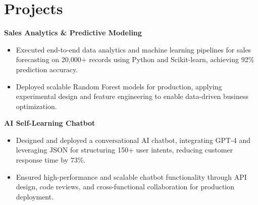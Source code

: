 \documentclass[a4paper,10pt]{article}
\begin{document}
\vspace{-4mm}

\section*{Projects}
\textbf{Sales Analytics \& Predictive Modeling} \\
\begin{itemize}[leftmargin=*, itemsep=0pt, parsep=1pt]
\vspace{-7mm}
    \item Executed end-to-end data analytics and machine learning pipelines for sales forecasting on 20,000+ records using Python and Scikit-learn, achieving 92\% prediction accuracy.
    \item Deployed scalable Random Forest models for production, applying experimental design and feature engineering to enable data-driven business optimization.
    \end{itemize}

\vspace{-2mm}
\textbf{AI Self-Learning Chatbot} \\
\begin{itemize}[leftmargin=*, itemsep=0pt, parsep=1pt]
\vspace{-7mm}
    \item Designed and deployed a conversational AI chatbot, integrating GPT-4 and leveraging JSON for structuring 150+ user intents, reducing customer response time by 73\%.
    \item Ensured high-performance and scalable chatbot functionality through API design, code reviews, and cross-functional collaboration for production deployment.
\end{itemize}

\vspace{-2mm}
\end{document}
